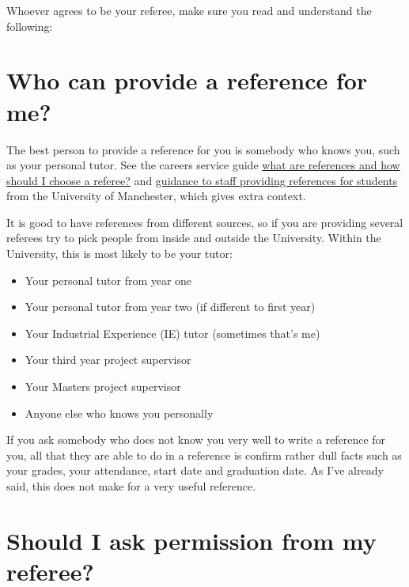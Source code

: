\documentclass[
  12pt,
]{book}
\providecommand{\tightlist}{%
  \setlength{\itemsep}{0pt}\setlength{\parskip}{0pt}}
\begin{document}
Whoever agrees to be your referee, make sure you read and understand the following:

\hypertarget{who-can-provide-a-reference-for-me}{%
\section{Who can provide a reference for me?}\label{who-can-provide-a-reference-for-me}}

The best person to provide a reference for you is somebody who knows you, such as your personal tutor. See the careers service guide \href{http://www.careers.manchester.ac.uk/applicationsinterviews/faqs/references}{what are references and how should I choose a referee?} and \href{http://documents.manchester.ac.uk/display.aspx?DocID=1921}{guidance to staff providing references for students} from the University of Manchester, which gives extra context.

It is good to have references from different sources, so if you are providing several referees try to pick people from inside and outside the University. Within the University, this is most likely to be your tutor:

\begin{itemize}
\tightlist
\item
  Your personal tutor from year one
\item
  Your personal tutor from year two (if different to first year)
\item
  Your Industrial Experience (IE) tutor (sometimes that's me)
\item
  Your third year project supervisor
\item
  Your Masters project supervisor
\item
  Anyone else who knows you personally
\end{itemize}

If you ask somebody who does not know you very well to write a reference for you, all that they are able to do in a reference is confirm rather dull facts such as your grades, your attendance, start date and graduation date. As I've already said, this does not make for a very useful reference.

\hypertarget{should-i-ask-permission-from-my-referee}{%
\section{Should I ask permission from my referee?}\label{should-i-ask-permission-from-my-referee}}
\end{document}
